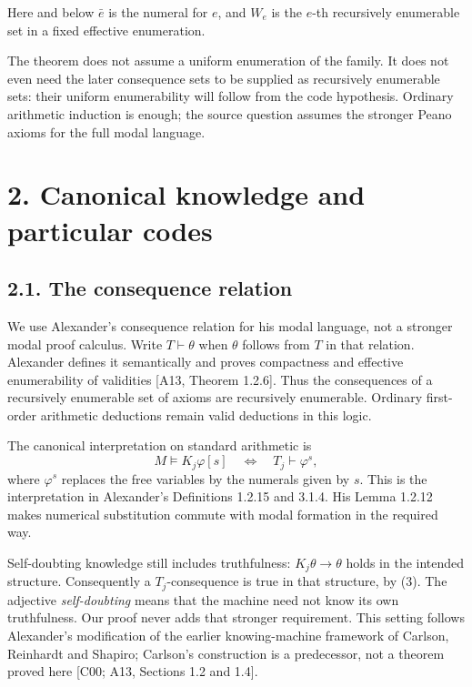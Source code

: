 \documentclass[
  11pt,
  letterpaper,
]{article}
\begin{document}
Here and below \(\bar e\) is the numeral for \(e\), and \(W_e\) is the
\(e\)-th recursively enumerable set in a fixed effective enumeration.

The theorem does not assume a uniform enumeration of the family. It does
not even need the later consequence sets to be supplied as recursively
enumerable sets: their uniform enumerability will follow from the code
hypothesis. Ordinary arithmetic induction is enough; the source question
assumes the stronger Peano axioms for the full modal language.

\section{2. Canonical knowledge and particular
codes}\label{canonical-knowledge-and-particular-codes}

\subsection{2.1. The consequence
relation}\label{the-consequence-relation}

We use Alexander's consequence relation for his modal language, not a
stronger modal proof calculus. Write \(T\vdash\theta\) when \(\theta\)
follows from \(T\) in that relation. Alexander defines it semantically
and proves compactness and effective enumerability of validities {[}A13,
Theorem 1.2.6{]}. Thus the consequences of a recursively enumerable set
of axioms are recursively enumerable. Ordinary first-order arithmetic
deductions remain valid deductions in this logic.

The canonical interpretation on standard arithmetic is \[
M\models K_j\varphi[s]
\quad\Longleftrightarrow\quad
T_j\vdash\varphi^s,
\tag{3}
\] where \(\varphi^s\) replaces the free variables by the numerals given
by \(s\). This is the interpretation in Alexander's Definitions 1.2.15
and 3.1.4. His Lemma 1.2.12 makes numerical substitution commute with
modal formation in the required way.

Self-doubting knowledge still includes truthfulness:
\(K_j\theta\rightarrow\theta\) holds in the intended structure.
Consequently a \(T_j\)-consequence is true in that structure, by (3).
The adjective \emph{self-doubting} means that the machine need not know
its own truthfulness. Our proof never adds that stronger requirement.
This setting follows Alexander's modification of the earlier
knowing-machine framework of Carlson, Reinhardt and Shapiro; Carlson's
construction is a predecessor, not a theorem proved here {[}C00; A13,
Sections 1.2 and 1.4{]}.
\end{document}

